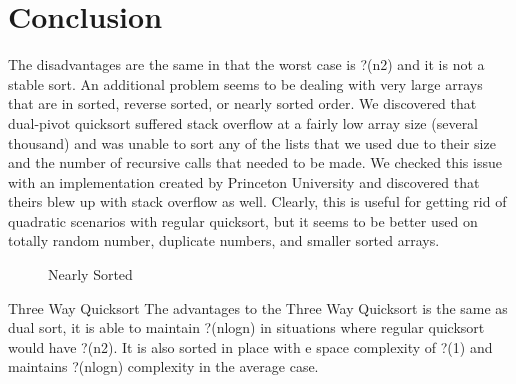 \documentclass{article}
\begin{document}
\section{Conclusion}

The disadvantages are the same in that the worst case is ?(n2) and it is not a stable sort. An 
additional problem seems to be dealing with very large arrays that are in sorted, reverse sorted, or 
nearly sorted order. We discovered that dual-pivot quicksort suffered stack overflow at a fairly low 
array size (several thousand) and was unable to sort any of the lists that we used due to their size 
and the number of recursive calls that needed to be made.  We checked this issue with an 
implementation created by Princeton University and discovered that theirs blew up with stack 
overflow as well. Clearly, this is useful for getting rid of quadratic scenarios with regular quicksort, 
but it seems to be better used on totally random number, duplicate numbers, and smaller sorted 
arrays.

\begin{figure}
\centering
{}
\caption{Nearly Sorted}
\label{graph-nearly}
\end{figure}

Three Way Quicksort
The advantages to the Three Way Quicksort is the same as dual sort, it is able to maintain 
?(nlogn) in situations where regular quicksort would have ?(n2). It is also sorted in place with e space 
complexity of ?(1) and maintains ?(nlogn) complexity in the average case.
\end{document}
